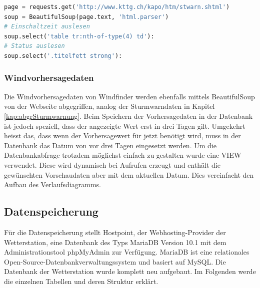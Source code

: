 \begin{lstlisting}[label=lst:kttgCrawler,caption=Web-Scrapper für die Sturmwarndaten, language=python, style=py]
page = requests.get('http://www.kttg.ch/kapo/htm/stwarn.shtml')
soup = BeautifulSoup(page.text, 'html.parser')
# Einschaltzeit auslesen
soup.select('table tr:nth-of-type(4) td'):
# Status auslesen
soup.select('.titelfett strong'):
\end{lstlisting}


\subsubsection{Windvorhersagedaten}
Die Windvorhersagedaten von Windfinder werden ebenfalls mittels BeautifulSoup von der Webseite abgegriffen, analog der Sturmwarndaten in Kapitel\,\ref{kap:abgrSturmwarnung}. Beim Speichern der Vorhersagedaten in der Datenbank ist jedoch speziell, dass der angezeigte Wert erst in drei Tagen gilt. Umgekehrt heisst das, dass wenn der Vorhersagewert für jetzt benötigt wird, muss in der Datenbank das Datum von vor drei Tagen eingesetzt werden.
Um die Datenbankabfrage trotzdem möglichst einfach zu gestalten wurde eine VIEW verwendet. Diese wird dynamisch bei Aufrufen erzeugt und enthält die gewünschten Vorschaudaten aber mit dem aktuellen Datum. Dies vereinfacht den Aufbau des Verlaufsdiagramms.


%
%


\subsection{Datenspeicherung}
Für die Datenspeicherung stellt Hostpoint, der Webhosting-Provider der Wetterstation, eine Datenbank des Typs MariaDB Version 10.1 mit dem Administrationstool phpMyAdmin zur Verfügung. MariaDB ist eine relationales Open-Source-Datenbankverwaltungssystem und basiert auf MySQL. Die Datenbank der Wetterstation wurde komplett neu aufgebaut. Im Folgenden werde die einzelnen Tabellen und deren Struktur erklärt.

